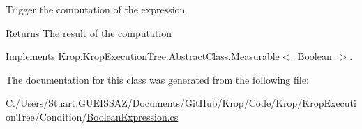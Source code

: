 Trigger the computation of the expression 

\begin{DoxyReturn}{Returns}
The result of the computation 
\end{DoxyReturn}


Implements \mbox{\hyperlink{class_krop_1_1_krop_execution_tree_1_1_abstract_class_1_1_measurable_afe91c739e2db11c8f316b07e8f55f7bb}{Krop.\+Krop\+Execution\+Tree.\+Abstract\+Class.\+Measurable$<$ Boolean $>$}}.



The documentation for this class was generated from the following file\+:\begin{DoxyCompactItemize}
\item 
C\+:/\+Users/\+Stuart.\+G\+U\+E\+I\+S\+S\+A\+Z/\+Documents/\+Git\+Hub/\+Krop/\+Code/\+Krop/\+Krop\+Execution\+Tree/\+Condition/\mbox{\hyperlink{_boolean_expression_8cs}{Boolean\+Expression.\+cs}}\end{DoxyCompactItemize}
